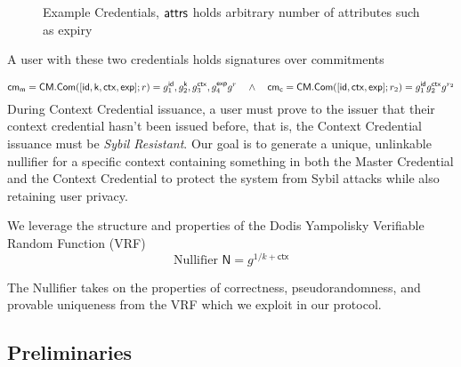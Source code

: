 \begin{figure}
        \begin{pchstack}[boxed, center, space=4em]
            \begin{pcvstack}
            \end{pcvstack}
            \pcvspace
            \begin{pcvstack}
            \end{pcvstack}
        \end{pchstack}
    \caption{Example Credentials, $\mathsf{attrs}$ holds arbitrary number of attributes such as expiry}
    \label{fig:two-creds}
\end{figure}
A user with these two credentials holds signatures over commitments

\[
\mathsf{cm_m} = \mathsf{CM.Com}([\mathsf{id}, \mathsf{k}, \mathsf{ctx}, \mathsf{exp}]; r) = g_1^{\mathsf{id}}, g_2^{\mathsf{k}}, g_3^{\mathsf{ctx}}, g_4^{\mathsf{exp}} g^r \quad \wedge \quad \mathsf{cm_c} = \mathsf{CM.Com}([\mathsf{id}, \mathsf{ctx}, \mathsf{exp}]; r_2) = g_1^{\mathsf{id}}g_2^{\mathsf{ctx}}g^{r_2}
\]
During Context Credential issuance, a user must prove to the issuer that their context credential hasn't been issued before, that is, the Context Credential issuance must be \emph{Sybil Resistant}. Our goal is to generate a unique, unlinkable nullifier for a specific context containing something in both the Master Credential and the Context Credential to protect the system from Sybil attacks while also retaining user privacy.

We leverage the structure and properties of the Dodis Yampolisky Verifiable Random Function (VRF)
\[
\text{Nullifier } \textsf{N} = g^{1/k + \textsf{ctx}}
\]

The Nullifier takes on the properties of correctness, pseudorandomness, and provable uniqueness from the VRF which we exploit in our protocol.


\subsection{Preliminaries}

